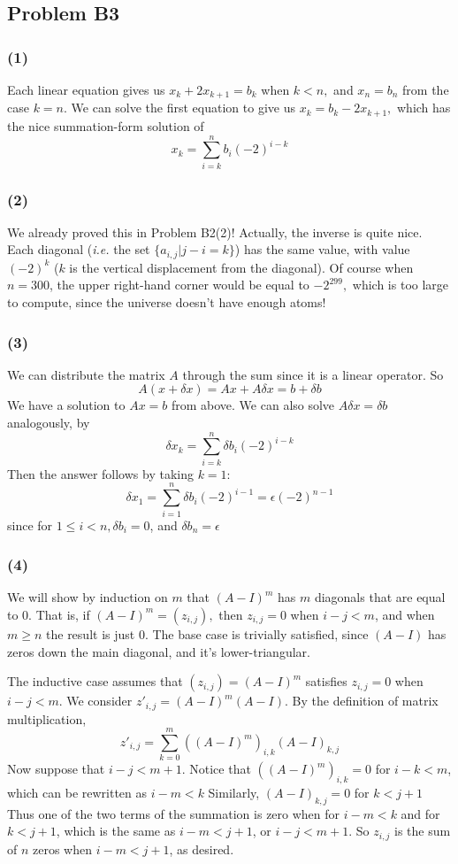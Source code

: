 \documentclass{article}
\begin{document}
\subsection{Problem B3}
\subsubsection{(1)}
Each linear equation gives us $x_k + 2x_{k+1} = b_k$ when $k < n,$ and
$x_n = b_n$ from the case $k = n.$ We can solve the first equation to give us
$x_k = b_k - 2x_{k+1},$ which has the nice summation-form solution of
\[x_k  = \sum_{i=k}^nb_{i}(-2)^{i-k}\]

\subsubsection{(2)}
We already proved this in Problem B2(2)!
Actually, the inverse is quite nice. Each diagonal (\emph{i.e.} the set
$\{a_{i,j}|j-i=k\}$) has the same value, with value $(-2)^k$ ($k$ is the vertical
displacement from the diagonal).
Of course when $n=300$, the upper right-hand corner would be equal to
$-2^{299},$ which is too large to compute, since the universe doesn't have
enough atoms!

\subsubsection{(3)}
We can distribute the matrix $A$ through the sum since it is a linear operator. So
\[A(x+\delta x)=Ax+A\delta x = b+\delta b\]
We have a solution to $Ax=b$ from above. We can also solve $A\delta x=\delta b$ analogously, by
\[\delta x_k = \sum_{i=k}^n \delta b_i (-2)^{i-k} \]
Then the answer follows by taking $k=1$:
\[\delta x_1 = \sum_{i=1}^n \delta b_i (-2)^{i-1} = \epsilon (-2)^{n-1}\]
since for $1\le i < n, \delta b_i = 0$, and $\delta b_n = \epsilon$


\subsubsection{(4)}
We will show by induction on $m$ that $(A-I)^m$ has $m$ diagonals that are equal
to 0. That is, if $(A-I)^m = (z_{i,j}),$ then $z_{i,j} = 0$ when $i - j < m$,
and when $m \geq n$ the result is just 0.
The base case is trivially satisfied, since $(A-I)$ has zeros down the main
diagonal, and it's lower-triangular.

The inductive case assumes that $(z_{i,j}) = (A-I)^m$ satisfies 
$z_{i,j} = 0$ when $i - j < m$.
We consider $z'_{i,j} = (A-I)^m(A-I).$
By the definition of matrix multiplication, 
\[z'_{i,j} = \sum_{k=0}^m ((A-I)^m)_{i,k}(A-I)_{k,j}\]
Now suppose that $i - j < m + 1.$
Notice that $((A - I)^m)_{i,k} = 0$ for $i - k < m$, which can be rewritten as
$i - m < k$
Similarly, $(A - I)_{k,j} = 0$ for $k < j + 1$
Thus one of the two terms of the summation is zero when for $i - m < k$ and
for $k < j + 1$, which is the same as $i - m < j + 1$, or $i - j < m + 1$.
So $z_{i,j}$ is the sum of $n$ zeros when $i - m < j + 1$, as desired.
\end{document}
